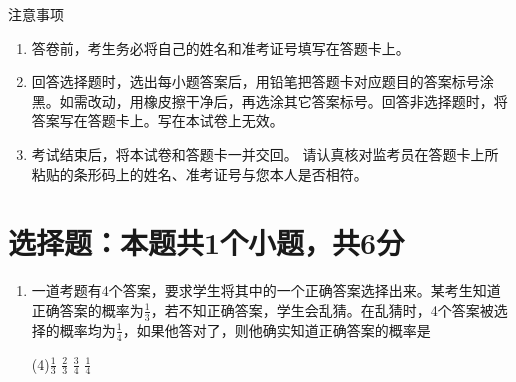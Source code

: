 \documentclass[12pt,twoside,space]{ctexart}
\begin{document}
\juemi
{}
{\heiti 注意事项}
\begin{enumerate}[itemsep=-0.3em,topsep=0pt]
\item 答卷前，考生务必将自己的姓名和准考证号填写在答题卡上。
\item 回答选择题时，选出每小题答案后，用铅笔把答题卡对应题目的答案标号涂黑。如需改动，用橡皮擦干净后，再选涂其它答案标号。回答非选择题时，将答案写在答题卡上。写在本试卷上无效。
\item 考试结束后，将本试卷和答题卡一并交回。
	请认真核对监考员在答题卡上所粘贴的条形码上的姓名、准考证号与您本人是否相符。
\end{enumerate}
\section{选择题：本题共1个小题，共6分}
\begin{enumerate}[itemsep=0.2em,topsep=0pt]
\item
一道考题有4个答案，要求学生将其中的一个正确答案选择出来。某考生知道正确答案的概率为$\frac{1}{3}$，若不知正确答案，学生会乱猜。在乱猜时，4个答案被选择的概率均为$\frac{1}{4}$，如果他答对了，则他确实知道正确答案的概率是
\begin{tasks}(4)\task $\frac{1}{3}$ \task $\frac{2}{3}$ \task $\frac{3}{4}$ \task $\frac{1}{4}$ 
\end{tasks}
\end{enumerate}
\end{document}
